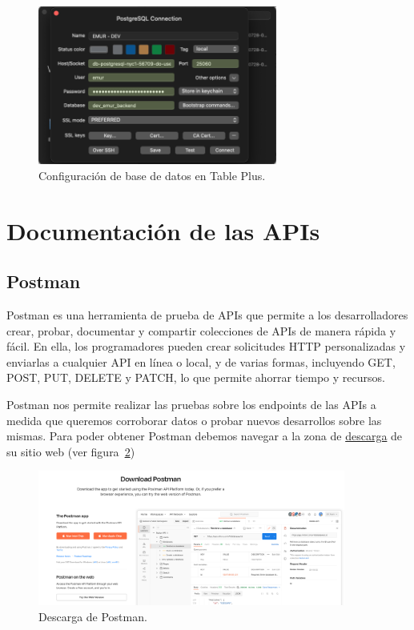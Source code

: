 \begin{figure}[h]
    \centering
    \includegraphics[width=0.7\textwidth]{img/manual/connect-table-plus.png}
    \caption{Configuración de base de datos en Table Plus.} \label{Img:Configuración+de+base de+datos+en+Table+Plus}
\end{figure} 


\section{Documentación de las APIs}\label{postman}

\subsection{Postman}\label{postman}
Postman es una herramienta de prueba de APIs que permite a los desarrolladores crear, probar, documentar y compartir colecciones de APIs de manera rápida y fácil. En ella, los programadores pueden crear solicitudes HTTP personalizadas y enviarlas a cualquier API en línea o local, y de varias formas, incluyendo GET, POST, PUT, DELETE y PATCH, lo que permite ahorrar tiempo y recursos.

Postman nos permite realizar las pruebas sobre los endpoints de las APIs a medida que queremos corroborar datos o probar nuevos desarrollos sobre las mismas.
Para poder obtener Postman debemos navegar a la zona de \href{https://www.postman.com/downloads/}{descarga} de su sitio web (ver figura~\ref{Img:Descarga+de+Postman})

\begin{figure}[h]
    \centering
    \includegraphics[width=0.9\textwidth]{img/manual/postman-descargas.png}
    \caption{Descarga de Postman.} \label{Img:Descarga+de+Postman}
\end{figure} 

